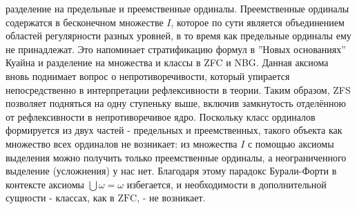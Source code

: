 \documentclass[12pt]{article}
\begin{document}
разделение на предельные и преемственные ординалы. Преемственные ординалы содержатся в бесконечном множестве $I$, которое по сути является объединением областей регулярности разных уровней, в то время как предельные ординалы ему не принадлежат. Это напоминает стратификацию формул в ''Новых основаниях'' Куайна и разделение на множества и классы в ZFC и NBG. Данная аксиома вновь поднимает вопрос о непротиворечивости, который упирается непосредственно в интерпретации рефлексивности в теории. Таким образом, ZFS позволяет подняться на одну ступеньку выше, включив замкнутость отделённою от рефлексивности в непротиворечивое ядро. Поскольку класс ординалов формируется из двух частей - предельных и преемственных, такого объекта как множество всех ординалов не возникает: из множества $I$ с помощью аксиомы выделения можно получить только преемственные ординалы, а неограниченного выделение (усложнения) у нас нет. Благодаря этому парадокс Бурали-Форти \cite{burali-forti} в контексте аксиомы $\bigcup \omega = \omega$ избегается, и необходимости в дополнительной сущности - классах, как в $\mathrm{ZFC}$, - не возникает. 
\end{document}
